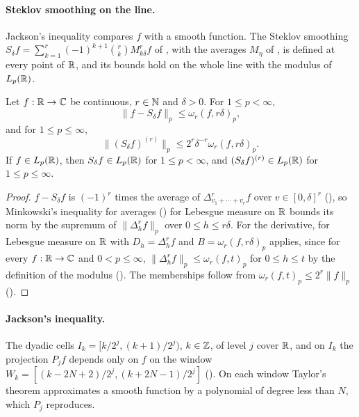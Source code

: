 \paragraph{Steklov smoothing on the line.}
Jackson's inequality compares $f$ with a smooth function. The Steklov smoothing
$S_\delta f = \sum_{k=1}^r (-1)^{k+1} \binom{r}{k} M_{k\delta}^r f$ of
, with the averages $M_\eta$ of , is defined at
every point of $\mathbb{R}$, and its bounds hold on the whole line with the modulus of $L_p(\mathbb{R})$.

\begin{proposition}
\label{prop:daub-steklov-line}
\leanok
{}
Let $f : \mathbb{R} \to \mathbb{C}$ be continuous, $r \in \mathbb{N}$ and $\delta > 0$. For $1 \leq p < \infty$,
\[
  \|f - S_\delta f\|_p \leq \omega_r(f, r\delta)_p ,
\]
and for $1 \leq p \leq \infty$,
\[
  \|(S_\delta f)^{(r)}\|_p \leq 2^r \delta^{-r} \omega_r(f, r\delta)_p .
\]
If $f \in L_p(\mathbb{R})$, then $S_\delta f \in L_p(\mathbb{R})$ for $1 \leq p < \infty$, and
$(S_\delta f)^{(r)} \in L_p(\mathbb{R})$ for $1 \leq p \leq \infty$.
\end{proposition}

\begin{proof}
\leanok
{}
$f - S_\delta f$ is $(-1)^r$ times the average of $\Delta_{v_1 + \cdots + v_r}^r f$ over
$v \in [0, \delta]^r$ (), so Minkowski's inequality for averages
() for Lebesgue measure on $\mathbb{R}$ bounds its norm by the supremum of
$\|\Delta_h^r f\|_p$ over $0 \leq h \leq r\delta$. For the derivative,
 for Lebesgue measure on $\mathbb{R}$ with $D_h = \Delta_h^r f$ and
$B = \omega_r(f, r\delta)_p$ applies, since for every $f : \mathbb{R} \to \mathbb{C}$ and $0 < p \leq \infty$,
$\|\Delta_h^r f\|_p \leq \omega_r(f, t)_p$ for $0 \leq h \leq t$ by the definition of the
modulus (). The memberships follow from $\omega_r(f, t)_p \leq 2^r \|f\|_p$
().
\end{proof}

\paragraph{Jackson's inequality.}
The dyadic cells $I_k = [k/2^j, (k+1)/2^j)$, $k \in \mathbb{Z}$, of level $j$ cover $\mathbb{R}$, and on $I_k$
the projection $P_j f$ depends only on $f$ on the window
$W_k = [(k - 2N + 2)/2^j, (k + 2N - 1)/2^j]$ (). On each window
Taylor's theorem approximates a smooth function by a polynomial of degree less than $N$, which
$P_j$ reproduces.

